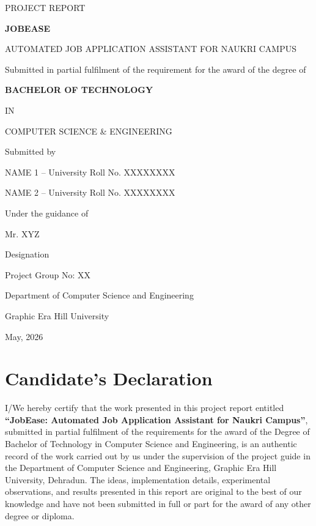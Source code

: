 \documentclass[12pt,a4paper,oneside]{report}
\begin{document}
\begin{titlepage}
\centering
{\Large PROJECT REPORT\par}
\vspace{1cm}
{\bfseries\LARGE JOBEASE\par}
\vspace{0.5cm}
{\large AUTOMATED JOB APPLICATION ASSISTANT FOR NAUKRI CAMPUS\par}
\vspace{1.2cm}
{\large Submitted in partial fulfilment of the requirement for the award of the degree of\par}
\vspace{0.5cm}
{\bfseries\Large BACHELOR OF TECHNOLOGY\par}
\vspace{0.3cm}
{\large IN\par}
\vspace{0.3cm}
{\large COMPUTER SCIENCE \& ENGINEERING\par}
\vspace{1.0cm}
{\large Submitted by\par}
\vspace{0.4cm}
{\large NAME 1 -- University Roll No. XXXXXXXX\par}
{\large NAME 2 -- University Roll No. XXXXXXXX\par}
\vspace{1.0cm}
{\large Under the guidance of\par}
\vspace{0.4cm}
{\large Mr. XYZ\par}
{\large Designation\par}
\vfill
{\large Project Group No: XX\par}
{\large Department of Computer Science and Engineering\par}
{\large Graphic Era Hill University\par}
{\large May, 2026\par}
\end{titlepage}

\chapter*{Candidate's Declaration}
I/We hereby certify that the work presented in this project report entitled \textbf{``JobEase: Automated Job Application Assistant for Naukri Campus''}, submitted in partial fulfilment of the requirements for the award of the Degree of Bachelor of Technology in Computer Science and Engineering, is an authentic record of the work carried out by us under the supervision of the project guide in the Department of Computer Science and Engineering, Graphic Era Hill University, Dehradun. The ideas, implementation details, experimental observations, and results presented in this report are original to the best of our knowledge and have not been submitted in full or part for the award of any other degree or diploma.
\end{document}
